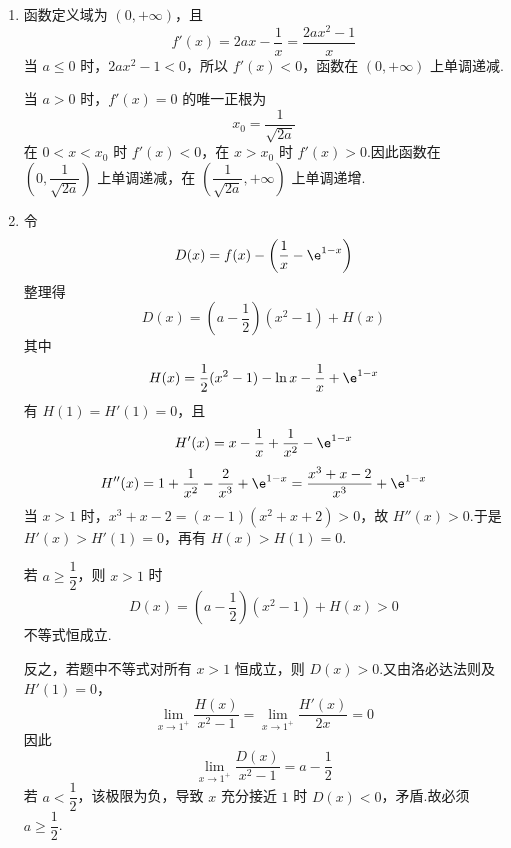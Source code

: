\begin{solution}
\begin{enumerate}
\item 函数定义域为 \((0,+\infty)\)，且
\[
f'(x)=2ax-\frac1x=\frac{2ax^2-1}{x}
\]
当 \(a\leq0\) 时，\(2ax^2-1<0\)，所以 \(f'(x)<0\)，函数在 \((0,+\infty)\) 上单调递减.

当 \(a>0\) 时，\(f'(x)=0\) 的唯一正根为
\[
x_0=\frac1{\sqrt{2a}}
\]
在 \(0<x<x_0\) 时 \(f'(x)<0\)，在 \(x>x_0\) 时 \(f'(x)>0\).因此函数在 \(\left(0,\dfrac1{\sqrt{2a}}\right)\) 上单调递减，在 \(\left(\dfrac1{\sqrt{2a}},+\infty\right)\) 上单调递增.

\item 令
\[
D(x)=f(x)-\left(\frac1x-\e^{1-x}\right)
\]
整理得
\[
D(x)=\left(a-\frac12\right)(x^2-1)+H(x)
\]
其中
\[
H(x)=\frac12(x^2-1)-\ln x-\frac1x+\e^{1-x}
\]
有 \(H(1)=H'(1)=0\)，且
\[
H'(x)=x-\frac1x+\frac1{x^2}-\e^{1-x}
\]
\[
H''(x)=1+\frac1{x^2}-\frac2{x^3}+\e^{1-x}
=\frac{x^3+x-2}{x^3}+\e^{1-x}
\]
当 \(x>1\) 时，\(x^3+x-2=(x-1)(x^2+x+2)>0\)，故 \(H''(x)>0\).于是 \(H'(x)>H'(1)=0\)，再有 \(H(x)>H(1)=0\).

若 \(a\geq\dfrac12\)，则 \(x>1\) 时
\[
D(x)=\left(a-\frac12\right)(x^2-1)+H(x)>0
\]
不等式恒成立.

反之，若题中不等式对所有 \(x>1\) 恒成立，则 \(D(x)>0\).又由洛必达法则及 \(H'(1)=0\)，
\[
\lim_{x\to1^+}\frac{H(x)}{x^2-1}
=\lim_{x\to1^+}\frac{H'(x)}{2x}=0
\]
因此
\[
\lim_{x\to1^+}\frac{D(x)}{x^2-1}=a-\frac12
\]
若 \(a<\dfrac12\)，该极限为负，导致 \(x\) 充分接近 \(1\) 时 \(D(x)<0\)，矛盾.故必须 \(a\geq\dfrac12\).
\end{enumerate}
\end{solution}
